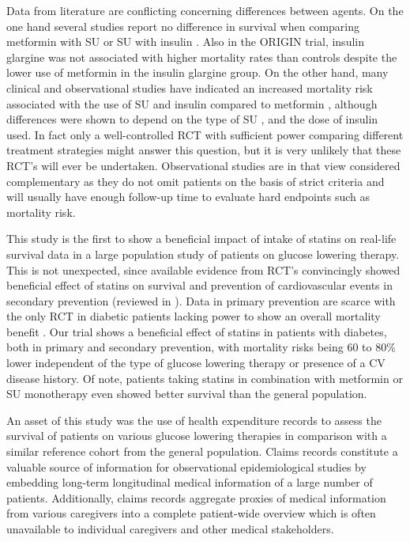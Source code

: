 Data from literature are conflicting concerning differences between agents. On the one hand several studies report no difference in survival when comparing metformin with SU \citep{s18,s19,s20} or SU with insulin \citep{s19}. Also in the ORIGIN trial, insulin glargine was not associated with higher mortality rates than controls \citep{s21} despite the lower use of metformin in the insulin glargine group. On the other hand, many clinical and observational studies have indicated an increased mortality risk associated with the use of SU and insulin compared to metformin \citep{s3,s4,s5,s6,s7,s8}, although differences were shown to depend on the type of SU \citep{s22,s23}, and the dose of insulin \citep{s24} used. In fact only a well-controlled RCT with sufficient power comparing different treatment strategies might answer this question, but it is very unlikely that these RCT's will ever be undertaken. Observational studies are in that view considered complementary as they do not omit patients on the basis of strict criteria and will usually have enough follow-up time to evaluate hard endpoints such as mortality risk. 

This study is the first to show a beneficial impact of intake of statins on real-life survival data in a large population study of patients on glucose lowering therapy. This is not unexpected, since available evidence from RCT's convincingly showed beneficial effect of statins on survival and prevention of cardiovascular events in secondary prevention (reviewed in \citep{s25}). Data in primary prevention are scarce with the only RCT in diabetic patients lacking power to show an overall mortality benefit \citep{s26}. Our trial shows a beneficial effect of statins in patients with diabetes, both in primary and secondary prevention, with mortality risks being 60 to 80\% lower independent of the type of glucose lowering therapy or presence of a CV disease history. Of note, patients taking statins in combination with metformin or SU monotherapy even showed better survival than the general population. 

An asset of this study was the use of health expenditure records to assess the survival of patients on various glucose lowering therapies in comparison with a similar reference cohort from the general population. Claims records constitute a valuable source of information for observational epidemiological studies by embedding long-term longitudinal medical information of a large number of patients. Additionally, claims records aggregate proxies of medical information from various caregivers into a complete patient-wide overview which is often unavailable to individual caregivers and other medical stakeholders. 

